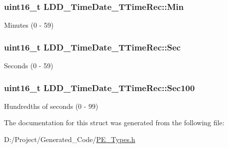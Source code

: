 \subsubsection[{Min}]{\setlength{\rightskip}{0pt plus 5cm}uint16\+\_\+t L\+D\+D\+\_\+\+Time\+Date\+\_\+\+T\+Time\+Rec\+::\+Min}\label{struct_l_d_d___time_date___t_time_rec_a7cea2c409e90bccdc33f19b093020373}
Minutes (0 -\/ 59) \hypertarget{struct_l_d_d___time_date___t_time_rec_a05cccc86e89e5704b0460caaf2429f75}{}
\subsubsection[{Sec}]{\setlength{\rightskip}{0pt plus 5cm}uint16\+\_\+t L\+D\+D\+\_\+\+Time\+Date\+\_\+\+T\+Time\+Rec\+::\+Sec}\label{struct_l_d_d___time_date___t_time_rec_a05cccc86e89e5704b0460caaf2429f75}
Seconds (0 -\/ 59) \hypertarget{struct_l_d_d___time_date___t_time_rec_a2cd2e13e7c478f04ea1c4c460b104491}{}
\subsubsection[{Sec100}]{\setlength{\rightskip}{0pt plus 5cm}uint16\+\_\+t L\+D\+D\+\_\+\+Time\+Date\+\_\+\+T\+Time\+Rec\+::\+Sec100}\label{struct_l_d_d___time_date___t_time_rec_a2cd2e13e7c478f04ea1c4c460b104491}
Hundredths of seconds (0 -\/ 99) 

The documentation for this struct was generated from the following file\+:\begin{DoxyCompactItemize}
\item 
D\+:/\+Project/\+Generated\+\_\+\+Code/\hyperlink{_p_e___types_8h}{P\+E\+\_\+\+Types.\+h}\end{DoxyCompactItemize}
